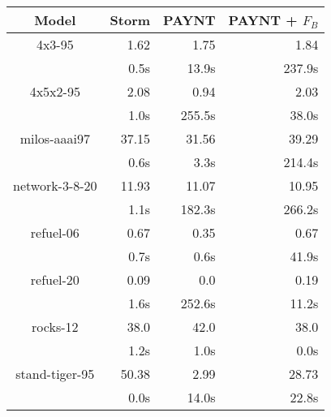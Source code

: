 \documentclass{article}
\begin{document}
\begin{table}
\begin{tabular}{|c|r|r|r|}
\hline

Model & Storm & PAYNT & PAYNT + $F_{B}$ \\ \hline 

4x3-95 & 1.62 & 1.75 & 1.84 \\
 & 0.5s & 13.9s & 237.9s \\
\hline
4x5x2-95 & 2.08 & 0.94 & 2.03 \\
 & 1.0s & 255.5s & 38.0s \\
\hline
milos-aaai97 & 37.15 & 31.56 & 39.29 \\
 & 0.6s & 3.3s & 214.4s \\
\hline
network-3-8-20 & 11.93 & 11.07 & 10.95 \\
 & 1.1s & 182.3s & 266.2s \\
\hline
refuel-06 & 0.67 & 0.35 & 0.67 \\
 & 0.7s & 0.6s & 41.9s \\
\hline
refuel-20 & 0.09 & 0.0 & 0.19 \\
 & 1.6s & 252.6s & 11.2s \\
\hline
rocks-12 & 38.0 & 42.0 & 38.0 \\
 & 1.2s & 1.0s & 0.0s \\
\hline
stand-tiger-95 & 50.38 & 2.99 & 28.73 \\
 & 0.0s & 14.0s & 22.8s \\
\hline
\end{tabular}
\end{table}
\end{document}
